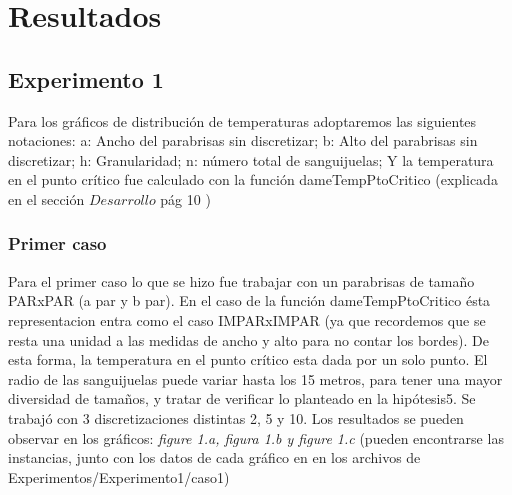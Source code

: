 \section{Resultados}

\subsection{Experimento 1}

Para los gráficos de distribución de temperaturas adoptaremos las siguientes notaciones:\newline
a: Ancho del parabrisas sin discretizar; \newline
b: Alto del parabrisas sin discretizar; \newline
h: Granularidad;\newline
n: número total de sanguijuelas;\newline
Y la temperatura en el punto crítico fue calculado con la función dameTempPtoCritico (explicada en el sección $Desarrollo$ pág 10 )\newline


\subsubsection{Primer caso}

Para el primer caso lo que se hizo fue trabajar con un parabrisas de tamaño PARxPAR (a par y b par). En el caso de la función dameTempPtoCritico ésta representacion entra como el caso IMPARxIMPAR (ya que recordemos que se resta una unidad a las medidas de ancho y alto para no contar los bordes). De esta forma, la temperatura en el punto crítico esta dada por un solo punto.
El radio de las sanguijuelas puede variar hasta los 15 metros, para tener una mayor diversidad de tamaños, y tratar de verificar lo planteado en la hipótesis5.\newline
Se trabajó con 3 discretizaciones distintas 2, 5 y 10. Los resultados se pueden observar en los gráficos: \textit{figure 1.a, figura 1.b y figure 1.c} (pueden encontrarse las instancias, junto con los datos de cada gráfico en en los archivos de Experimentos/Experimento1/caso1)

